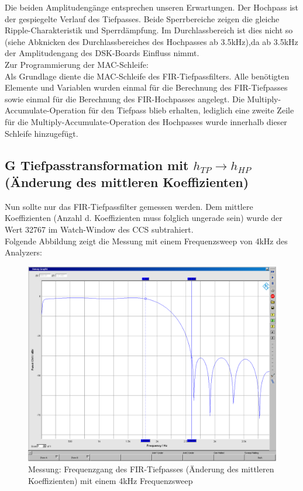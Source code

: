 \noindent Die beiden Amplitudengänge entsprechen unseren Erwartungen. Der Hochpass ist der gespiegelte Verlauf des Tiefpasses. Beide Sperrbereiche zeigen die gleiche Ripple-Charakteristik und Sperrdämpfung.
Im Durchlassbereich ist dies nicht so (siehe Abknicken des Durchlassbereiches des Hochpasses ab 3.5kHz),da ab 3.5kHz der Amplitudengang des DSK-Boards Einfluss nimmt. \\
\noindent Zur Programmierung der MAC-Schleife: \\
\noindent Als Grundlage diente die MAC-Schleife des FIR-Tiefpassfilters. Alle benötigten Elemente und Variablen wurden einmal für die Berechnung des FIR-Tiefpasses sowie einmal für die Berechnung des FIR-Hochpasses angelegt. Die Multiply-Accumulate-Operation für den Tiefpass blieb erhalten, lediglich eine zweite Zeile für die Multiply-Accumulate-Operation des Hochpasses wurde innerhalb dieser Schleife hinzugefügt.

\clearpage

\subsection{G Tiefpasstransformation mit $h_{TP} \rightarrow h_{HP}$ (Änderung des mittleren Koeffizienten)}
\noindent Nun sollte nur das FIR-Tiefpassfilter gemessen werden. Dem mittlere Koeffizienten (Anzahl d. Koeffizienten muss folglich ungerade sein) wurde der Wert 32767 im Watch-Window des CCS subtrahiert.\\
Folgende Abbildung zeigt die Messung mit einem Frequenzsweep von 4kHz des Analyzers:\\

\begin{figure}[h]
	\centering
	\includegraphics[width=1\linewidth]{Bilder/Attachment_G_1-TP}
	\caption{Messung: Frequenzgang des FIR-Tiefpasses (Änderung des mittleren Koeffizienten) mit einem 4kHz Frequenzsweep}
	\label{fig:Attachment_G_1-TP}
\end{figure}

 
